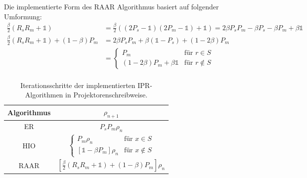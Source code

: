 Die implementierte Form des RAAR Algorithmus basiert auf folgender Umformung:
\begin{align*}
	\frac{\beta}{2}\left(R_sR_m+\mathbb{1}\right)
	                              & =\frac{\beta}{2}\left((2P_s-\mathbb{1})(2P_m-\mathbb{1})+\mathbb{1}\right) 
	=2\beta P_sP_m-\beta P_s-\beta P_m+\beta\mathbb{1}\\
	\frac{\beta}{2}\left(R_sR_m+\mathbb{1}\right)+\left(1-\beta\right) P_m
	                              & =2\beta P_sP_m+\beta (\mathbb{1}-P_s)+ (1-2\beta)P_m                       \\
	                              & =                                                                          
	\begin{cases}
	P_m                           & \text{für } r\in S                                                        \\
	(1-2\beta)P_m+\beta\mathbb{1} & \text{für } r\notin S                                                     
	\end{cases}\\
\end{align*}
\begin{table}
	\centering
	\begin{tabular}{cc}
		\hline
		Algorithmus                             & $\rho_{n+1}$                                                                               \\ 							
		\hline
		ER                                      & $P_sP_m\rho_n$                                                                             \\ 								
		HIO                                     & $\begin{cases}                                                                             
		P_m\rho_n                               & \text{für } x\in S                                                                        \\
		\left[\mathbb{1}-\beta P_m\right]\rho_n & \text{für } x\notin S                                                                     
		\end{cases}$\\
		RAAR                                    & $\left[\frac{\beta}{2}\left(R_sR_m+\mathbb{1}\right)+\left(1-\beta\right)P_m\right]\rho_n$ \\																
		\hline
	\end{tabular}
	\caption[IPR-Algorithmen]{Iterationsschritte der implementierten IPR-Algorithmen in Projektorenschreibweise.}
	\label{tab:ipr}
\end{table}	

